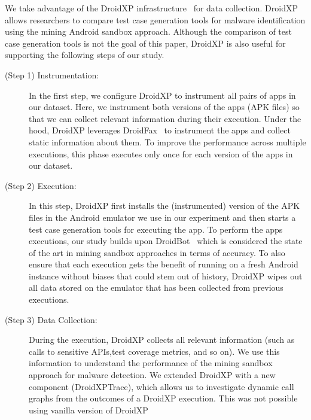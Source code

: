 We take advantage of the DroidXP infrastructure~\cite{DBLP:conf/scam/CostaMCMVBC20}
for data collection. DroidXP allows researchers to compare 
test case generation tools for malware identification using the
mining Android sandbox approach. Although the comparison of test
case generation tools is not the goal of this paper, DroidXP
is also useful for supporting the following steps of our study.

\begin{description}
 \item[(Step 1) Instrumentation:] In the first step,
we configure DroidXP to instrument all pairs of apps in our dataset.
Here, we instrument both versions of the apps (APK files) so that
we can collect relevant information during their execution. Under the hood, DroidXP leverages
DroidFax~\cite{DBLP:conf/icsm/CaiR17a} to instrument the apps and collect static
information about them. To improve the performance across multiple executions,
this phase executes only once for each version of the apps in our dataset.

\item[(Step 2) Execution:] In this step, DroidXP first installs the (instrumented) version of the APK files in the
  Android emulator we use in our experiment and then starts a test case generation tools for executing the app. To perform the apps executions, our study builds upon DroidBot~\cite{DBLP:conf/icse/LiYGC17} which is considered the state of the art in mining sandbox approaches in terms of accuracy. To also ensure
  that each execution gets the benefit of running on a fresh Android instance without biases that could stem out of history,
  DroidXP wipes out all data stored on the emulator that has been collected from previous executions.

\item[(Step 3) Data Collection:] During the execution, DroidXP collects all relevant information (such as calls to sensitive APIs,test coverage metrics, and so on). We use this information to understand the performance of the mining sandbox approach for malware detection. We extended DroidXP with a new component (DroidXPTrace), which allows us to investigate dynamic call graphs from the outcomes of a DroidXP execution. This was not possible using vanilla version of DroidXP %
\end{description}

